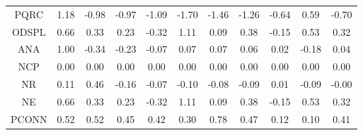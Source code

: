 \begin{longtable}{ | c || c | c | c | c | c | c | c | c | c || c |}
PQRC &  \cellcolor[HTML]{DFDFFF} 1.18 &  \cellcolor[HTML]{FFE7E7} -0.98 &  \cellcolor[HTML]{FFE7E7} -0.97 &  \cellcolor[HTML]{FFE7E7} -1.09 &  \cellcolor[HTML]{FFD7D7} -1.70 &  \cellcolor[HTML]{FFD7D7} -1.46 &  \cellcolor[HTML]{FFDFDF} -1.26 &  \cellcolor[HTML]{FFEFEF} -0.64 &  \cellcolor[HTML]{EFEFFF} 0.59 &  \cellcolor[HTML]{FFEFEF} -0.70 \\
ODSPL &  \cellcolor[HTML]{EFEFFF} 0.66 &  \cellcolor[HTML]{F7F7FF} 0.33 &  \cellcolor[HTML]{F7F7FF} 0.23 &  \cellcolor[HTML]{FFF7F7} -0.32 &  \cellcolor[HTML]{E7E7FF} 1.11 &  \cellcolor[HTML]{FFFFFF} 0.09 &  \cellcolor[HTML]{F7F7FF} 0.38 &  \cellcolor[HTML]{FFFFFF} -0.15 &  \cellcolor[HTML]{EFEFFF} 0.53 &  \cellcolor[HTML]{F7F7FF} 0.32 \\
ANA &  \cellcolor[HTML]{E7E7FF} 1.00 &  \cellcolor[HTML]{FFF7F7} -0.34 &  \cellcolor[HTML]{FFF7F7} -0.23 &  \cellcolor[HTML]{FFFFFF} -0.07 &  \cellcolor[HTML]{FFFFFF} 0.07 &  \cellcolor[HTML]{FFFFFF} 0.07 &  \cellcolor[HTML]{FFFFFF} 0.06 &  \cellcolor[HTML]{FFFFFF} 0.02 &  \cellcolor[HTML]{FFF7F7} -0.18 &  \cellcolor[HTML]{FFFFFF} 0.04 \\
NCP &  \cellcolor[HTML]{FFFFFF} 0.00 &  \cellcolor[HTML]{FFFFFF} 0.00 &  \cellcolor[HTML]{FFFFFF} 0.00 &  \cellcolor[HTML]{FFFFFF} 0.00 &  \cellcolor[HTML]{FFFFFF} 0.00 &  \cellcolor[HTML]{FFFFFF} 0.00 &  \cellcolor[HTML]{FFFFFF} 0.00 &  \cellcolor[HTML]{FFFFFF} 0.00 &  \cellcolor[HTML]{FFFFFF} 0.00 &  \cellcolor[HTML]{FFFFFF} 0.00 \\
NR &  \cellcolor[HTML]{FFFFFF} 0.11 &  \cellcolor[HTML]{F7F7FF} 0.46 &  \cellcolor[HTML]{FFFFFF} -0.16 &  \cellcolor[HTML]{FFFFFF} -0.07 &  \cellcolor[HTML]{FFFFFF} -0.10 &  \cellcolor[HTML]{FFFFFF} -0.08 &  \cellcolor[HTML]{FFFFFF} -0.09 &  \cellcolor[HTML]{FFFFFF} 0.01 &  \cellcolor[HTML]{FFFFFF} -0.09 &  \cellcolor[HTML]{FFFFFF} -0.00 \\
NE &  \cellcolor[HTML]{EFEFFF} 0.66 &  \cellcolor[HTML]{F7F7FF} 0.33 &  \cellcolor[HTML]{F7F7FF} 0.23 &  \cellcolor[HTML]{FFF7F7} -0.32 &  \cellcolor[HTML]{E7E7FF} 1.11 &  \cellcolor[HTML]{FFFFFF} 0.09 &  \cellcolor[HTML]{F7F7FF} 0.38 &  \cellcolor[HTML]{FFFFFF} -0.15 &  \cellcolor[HTML]{EFEFFF} 0.53 &  \cellcolor[HTML]{F7F7FF} 0.32 \\
PCONN &  \cellcolor[HTML]{EFEFFF} 0.52 &  \cellcolor[HTML]{EFEFFF} 0.52 &  \cellcolor[HTML]{F7F7FF} 0.45 &  \cellcolor[HTML]{F7F7FF} 0.42 &  \cellcolor[HTML]{F7F7FF} 0.30 &  \cellcolor[HTML]{EFEFFF} 0.78 &  \cellcolor[HTML]{F7F7FF} 0.47 &  \cellcolor[HTML]{FFFFFF} 0.12 &  \cellcolor[HTML]{FFFFFF} 0.10 &  \cellcolor[HTML]{F7F7FF} 0.41 \\

\end{longtable}

